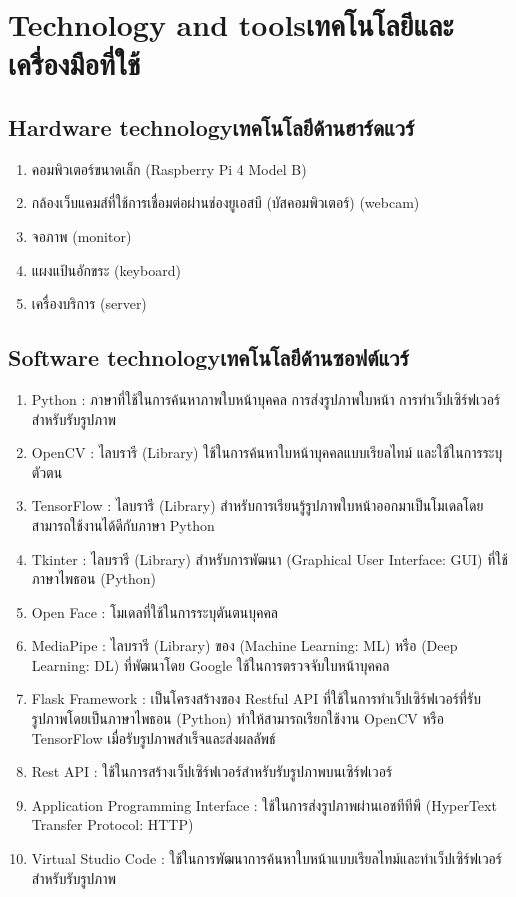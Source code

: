 \section{\ifenglish Technology and tools\else เทคโนโลยีและเครื่องมือที่ใช้\fi}
\subsection{\ifenglish Hardware technology\else เทคโนโลยีด้านฮาร์ดแวร์\fi}
\begin{enumerate}
    \item คอมพิวเตอร์ขนาดเล็ก (Raspberry Pi 4 Model B)
    \item กล้องเว็บแคมส์ที่ใช้การเชื่อมต่อผ่านช่องยูเอสบี (บัสคอมพิวเตอร์) (webcam)
    \item จอภาพ (monitor)
    \item แผงแป้นอักขระ (keyboard)
    \item เครื่องบริการ (server)
\end{enumerate}

\subsection{\ifenglish Software technology\else เทคโนโลยีด้านซอฟต์แวร์\fi}
\begin{enumerate}
    \item Python : ภาษาที่ใช้ในการค้นหาภาพใบหน้าบุคคล การส่งรูปภาพใบหน้า การทำเว็ปเซิร์ฟเวอร์สำหรับรับรูปภาพ
    \item OpenCV : ไลบรารี (Library) ใช้ในการค้นหาใบหน้าบุคคลแบบเรียลไทม์ และใช้ในการระบุตัวตน
    \item TensorFlow : ไลบรารี (Library) สำหรับการเรียนรู้รูปภาพใบหน้าออกมาเป็นโมเดลโดยสามารถใช้งานได้ดีกับภาษา Python
    \item Tkinter : ไลบรารี (Library) สำหรับการพัฒนา (Graphical User Interface: GUI) ที่ใช้ภาษาไพธอน (Python)
    \item Open Face : โมเดลที่ใช้ในการระบุตันตนบุคคล
    \item MediaPipe : ไลบรารี (Library) ของ (Machine Learning: ML) หรือ (Deep Learning: DL) ที่พัฒนาโดย Google ใช้ในการตรวจจับใบหน้าบุคคล
    \item Flask Framework : เป็นโครงสร้างของ Restful API ที่ใช้ในการทำเว็ปเซิร์ฟเวอร์ที่รับรูปภาพโดยเป็นภาษาไพธอน (Python) ทำให้สามารถเรียกใช้งาน OpenCV หรือ TensorFlow เมื่อรับรูปภาพสำเร็จและส่งผลลัพธ์
    \item Rest API : ใช้ในการสร้างเว็ปเซิร์ฟเวอร์สำหรับรับรูปภาพบนเซิร์ฟเวอร์
    \item Application Programming Interface : ใช้ในการส่งรูปภาพผ่านเอชทีทีพี (HyperText Transfer Protocol: HTTP)
    \item Virtual Studio Code : ใช้ในการพัฒนาการค้นหาใบหน้าแบบเรียลไทม์และทำเว็ปเซิร์ฟเวอร์สำหรับรับรูปภาพ
    
\end{enumerate}

